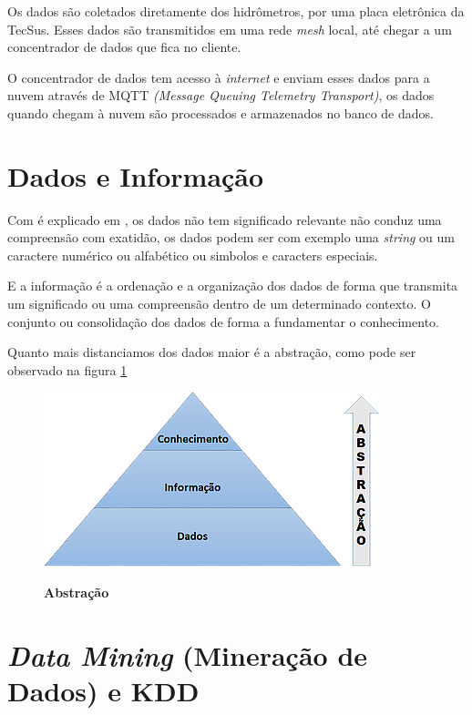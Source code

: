 \par Os dados são coletados diretamente dos hidrômetros, por uma placa eletrônica da TecSus. Esses dados são transmitidos em uma rede \emph{mesh} local, até chegar a um concentrador de dados que fica no cliente.
\par O concentrador de dados tem acesso à \emph{internet} e enviam esses dados para a nuvem através de MQTT \emph{(Message Queuing Telemetry Transport)}, os dados quando chegam à nuvem são processados e armazenados no banco de dados.


\section{Dados e Informação}

\par Com é explicado em  \cite{Elias}, os dados não tem  significado relevante não conduz uma compreensão com exatidão, os dados podem ser com exemplo uma \emph{string} ou um caractere numérico ou alfabético ou simbolos e caracters especiais.
\par E a informação é a ordenação e a organização dos dados de forma que transmita um significado ou uma compreensão dentro de um determinado contexto. O conjunto ou consolidação dos dados de forma a fundamentar o conhecimento.
\par Quanto mais distanciamos dos dados maior é a abstração, como pode ser observado na figura \ref{abst}
\begin{figure}[ht]
	\caption{\textbf{Abstração}}
	\centering
		\includegraphics[width=\textwidth,height=\textheight, keepaspectratio]{figuras/abstracao}
		\label{abst}
\end{figure}


\section{\emph{Data Mining} (Mineração de Dados) e KDD}

